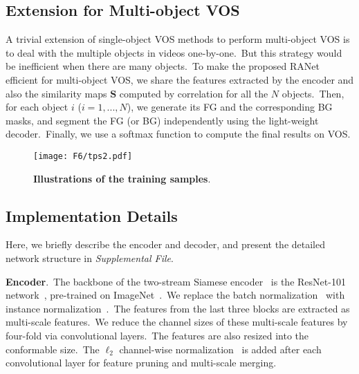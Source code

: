 \documentclass[10pt,twocolumn,letterpaper]{article}
\begin{document}
\subsection{Extension for Multi-object VOS}
\label{sec:mifg}

A trivial extension of single-object VOS methods to perform multi-object VOS is to deal with the multiple objects in videos one-by-one.\ But this strategy would be inefficient when there are many objects.\ To make the proposed RANet efficient for multi-object VOS, we share the features extracted by the encoder and also the similarity maps $\mathbf{S}$ computed by correlation for all the $N$ objects.\ Then, for each object $i$ ($i=1,...,N$), we generate its FG and the corresponding BG masks, and segment the FG (or BG) independently using the light-weight decoder.\ Finally, we use a softmax function to compute the final results on VOS.





\iffalse
\begin{figure}
\begin{center}
\texttt{[image: F6/filtermulti.pdf]}
\end{center}
\caption{our}
\label{fig:filter multi}
\end{figure}
\fi

\begin{figure}
\begin{center}
\texttt{[image: F6/tps2.pdf]}
\end{center}
\vspace{-7mm}
\caption{\textbf{Illustrations of the training samples}. }
\label{fig:tps}
\vspace{-6mm}
\end{figure}


\subsection{Implementation Details}
\label{sec:imple}
Here, we briefly describe the encoder and decoder, and present the detailed network structure in \textsl{Supplemental File}.

\noindent
\textbf{Encoder}.\ The backbone of the two-stream Siamese encoder~\cite{siamfc} is the ResNet-101 network~\cite{resnet}, pre-trained on ImageNet~\cite{imagenet}.\ We replace the batch normalization~\cite{bn2015} with instance normalization~\cite{in2016}.\ The features from the last three blocks are extracted as multi-scale features.\ We reduce the channel sizes of these multi-scale features by four-fold via convolutional layers.\ The features are also resized into the conformable size.\ The $\ell_{2}$ channel-wise normalization~\cite{hoffer2018norm} is added after each convolutional layer for feature pruning and multi-scale merging. 
\end{document}
